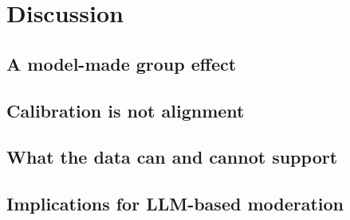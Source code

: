 \section{Discussion}
\label{sec:discussion}

\subsection{A model-made group effect}

\subsection{Calibration is not alignment}

\subsection{What the data can and cannot support}

\subsection{Implications for LLM-based moderation}


